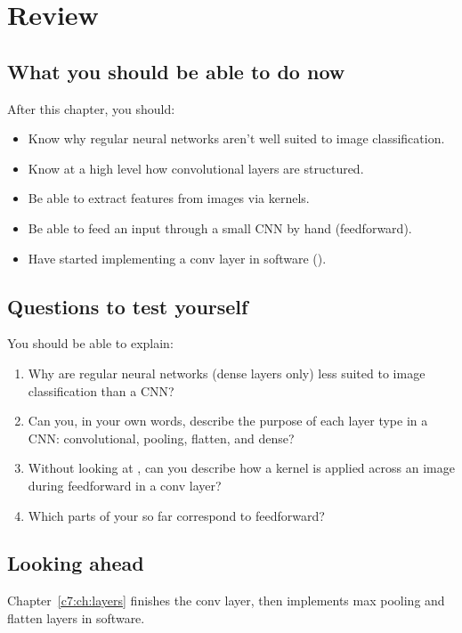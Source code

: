 
\section{Review}
\label{c6:sec:review}

\subsection*{What you should be able to do now}
After this chapter, you should:
\begin{itemize}
  \item Know why regular neural networks aren't well suited to image classification.
  \item Know at a high level how convolutional layers are structured.
  \item Be able to extract features from images via kernels.
  \item Be able to feed an input through a small CNN by hand (feedforward).
  \item Have started implementing a conv layer in software ().
\end{itemize}

\subsection*{Questions to test yourself}
You should be able to explain:
\begin{enumerate}
  \item Why are regular neural networks (dense layers only) less suited to image classification
    than a CNN?
  \item Can you, in your own words, describe the purpose of each layer type in a CNN:
    convolutional, pooling, flatten, and dense?
  \item Without looking at , can you describe how a kernel is applied across an
    image during feedforward in a conv layer?
  \item Which parts of your  so far correspond to feedforward?
\end{enumerate}

\subsection*{Looking ahead}
Chapter~\ref{c7:ch:layers} finishes the conv layer, then implements max pooling and flatten layers
in software.
